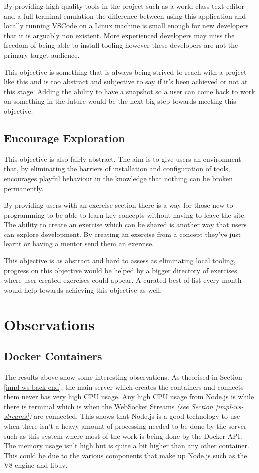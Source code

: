 \documentclass[12pt, a4paper]{extreport}
\begin{document}
By providing high quality tools in the project such as a world class text editor and a full terminal emulation the difference between using this application and locally running VSCode on a Linux machine is small enough for new developers that it is arguably non existent. More experienced developers may miss the freedom of being able to install tooling however these developers are not the primary target audience.

This objective is something that is always being strived to reach with a project like this and is too abstract and subjective to say if it's been achieved or not at this stage. Adding the ability to have a snapshot so a user can come back to work on something in the future would be the next big step towards meeting this objective.

\subsection{Encourage Exploration}

This objective is also fairly abstract. The aim is to give users an environment that, by eliminating the barriers of installation and configuration of tools, encourages playful behaviour in the knowledge that nothing can be broken permanently.

By providing users with an exercise section there is a way for those new to programming to be able to learn key concepts without having to leave the site. The ability to create an exercise which can be shared is another way that users can explore development. By creating an exercise from a concept they've just learnt or having a mentor send them an exercise.

This objective is as abstract and hard to assess as eliminating local tooling, progress on this objective would be helped by a bigger directory of exercises where user created exercises could appear. A curated best of list every month would help towards achieving this objective as well. 

\section{Observations}

\subsection{Docker Containers}

The results above show some interesting observations. As theorised in Section \ref{impl-ws-back-end}, the main server which creates the containers and connects them never has very high CPU usage. Any high CPU usage from Node.js is while there is terminal which is when the WebSocket Streams \textit{(see Section \ref{impl-ws-streams})} are connected. This shows that Node.js is a good technology to use when there isn't a heavy amount of processing needed to be done by the server such as this system where most of the work is being done by the Docker API. The memory usage isn't high but is quite a bit higher than any other container. This could be due to the various components that make up Node.js such as the V8 engine and libuv.
\end{document}
